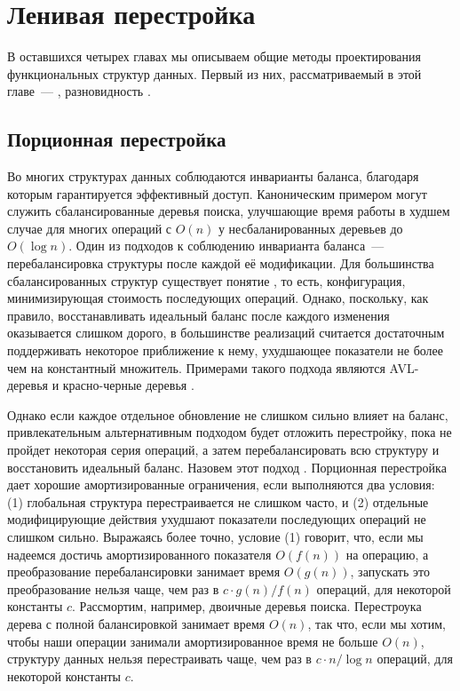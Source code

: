\chapter{Ленивая перестройка}
\label{ch:8}

В оставшихся четырех главах мы описываем общие методы проектирования
функциональных структур данных.  Первый из них, рассматриваемый в этой
главе~--- , разновидность
 \cite{Overmars1983}.

\section{Порционная перестройка}

Во многих структурах данных соблюдаются инварианты баланса, благодаря
которым гарантируется эффективный доступ. Каноническим примером могут
служить сбалансированные деревья поиска, улучшающие время работы в
худшем случае для многих операций с $O(n)$ у несбаланированных
деревьев до $O(\log n)$. Один из подходов к соблюдению инварианта
баланса~--- перебалансировка структуры после каждой её
модификации. Для большинства сбалансированных структур существует
понятие , то есть,
конфигурация, минимизирующая стоимость последующих операций. Однако,
поскольку, как правило, восстанавливать идеальный баланс после
каждого изменения оказывается слишком дорого, в большинстве реализаций
считается достаточным поддерживать некоторое приближение к нему,
ухудшающее показатели не более чем на константный множитель. Примерами
такого подхода являются AVL-деревья \cite{AdelsonVelskiiLandis1962}
и красно-черные деревья \cite{GuibasSedgewick1978}.

Однако если каждое отдельное обновление не слишком сильно влияет на
баланс, привлекательным альтернативным подходом будет отложить
перестройку, пока не пройдет некоторая серия операций, а затем
перебалансировать всю структуру и восстановить идеальный
баланс. Назовем этот подход . Порционная перестройка дает хорошие амортизированные
ограничения, если выполняются два условия: (1) глобальная структура
перестраивается не слишком часто, и (2) отдельные модифицирующие
действия ухудшают показатели последующих операций не слишком
сильно. Выражаясь более точно, условие (1) говорит, что, если мы
надеемся достичь амортизированного показателя $O(f(n))$ на операцию, а
преобразование перебалансировки занимает время $O(g(n))$, запускать
это преобразование нельзя чаще, чем раз в $c \cdot g(n) / f(n)$
операций, для некоторой константы $c$. Рассмортим, например, двоичные
деревья поиска. Перестроука дерева с полной балансировкой занимает
время $O(n)$, так что, если мы хотим, чтобы наши операции занимали
амортизированное время не больше $O(n)$, структуру данных нельзя
перестраивать чаще, чем раз в $c \cdot n / \log n$ операций, для
некоторой константы $c$.

